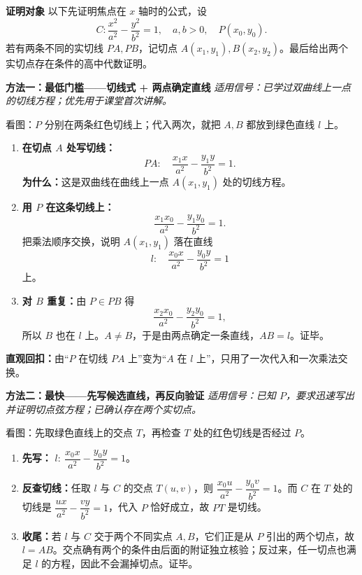 \begin{proofbox}
\textbf{\textcolor{CProof}{证明对象}}
以下先证明焦点在 $x$ 轴时的公式，设
\[
C:\frac{x^2}{a^2}-\frac{y^2}{b^2}=1,\quad a,b>0,\quad P(x_0,y_0).
\]
若有两条不同的实切线 $PA,PB$，记切点 $A(x_1,y_1), B(x_2,y_2)$。最后给出两个实切点存在条件的高中代数证明。

\medskip
\begin{minipage}{\linewidth}
\textbf{\textcolor{CProof}{方法一：最低门槛——切线式 + 两点确定直线}}
\textit{适用信号：已学过双曲线上一点的切线方程；优先用于课堂首次讲解。}
\begin{center}

\end{center}
看图：$P$ 分别在两条红色切线上；代入两次，就把 $A,B$ 都放到绿色直线 $l$ 上。

\end{minipage}
\begin{enumerate}[leftmargin=*,itemsep=0.4em]
\item \textbf{在切点 $A$ 处写切线：}
\[PA:\quad \frac{x_1x}{a^2}-\frac{y_1y}{b^2}=1.\]
\textbf{为什么：}这是双曲线在曲线上一点 $A(x_1,y_1)$ 处的切线方程。
\item \textbf{用 $P$ 在这条切线上：}
\[\frac{x_1x_0}{a^2}-\frac{y_1y_0}{b^2}=1.\]
把乘法顺序交换，说明 $A(x_1,y_1)$ 落在直线
\[l:\quad \frac{x_0x}{a^2}-\frac{y_0y}{b^2}=1\]
上。
\item \textbf{对 $B$ 重复：}由 $P\in PB$ 得
\[\frac{x_2x_0}{a^2}-\frac{y_2y_0}{b^2}=1,\]
所以 $B$ 也在 $l$ 上。$A\ne B$，于是由两点确定一条直线，\textbf{$AB=l$}。证毕。
\end{enumerate}
\textbf{直观回扣：}由“$P$ 在切线 $PA$ 上”变为“$A$ 在 $l$ 上”，只用了一次代入和一次乘法交换。

\medskip
\begin{minipage}{\linewidth}
\textbf{\textcolor{CProof}{方法二：最快——先写候选直线，再反向验证}}
\textit{适用信号：已知 $P$，要求迅速写出并证明切点弦方程；已确认存在两个实切点。}
\begin{center}

\end{center}
看图：先取绿色直线上的交点 $T$，再检查 $T$ 处的红色切线是否经过 $P$。

\end{minipage}
\begin{enumerate}[leftmargin=*,itemsep=0.3em]
\item \textbf{先写：} $l:\ \dfrac{x_0x}{a^2}-\dfrac{y_0y}{b^2}=1$。
\item \textbf{反查切线：}任取 $l$ 与 $C$ 的交点 $T(u,v)$，则 $\dfrac{x_0u}{a^2}-\dfrac{y_0v}{b^2}=1$。而 $C$ 在 $T$ 处的切线是 $\dfrac{ux}{a^2}-\dfrac{vy}{b^2}=1$，代入 $P$ 恰好成立，故 $PT$ 是切线。
\item \textbf{收尾：}若 $l$ 与 $C$ 交于两个不同实点 $A,B$，它们正是从 $P$ 引出的两个切点，故 $l=AB$。交点确有两个的条件由后面的附证独立核验；反过来，任一切点也满足 $l$ 的方程，因此不会漏掉切点。证毕。
\end{enumerate}



\end{proofbox}
